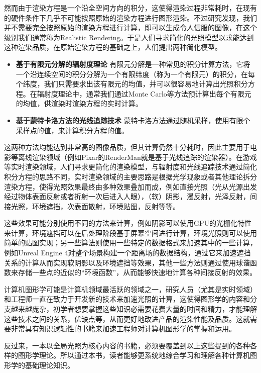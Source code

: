 然而由于渲染方程是一个沿全空间方向的积分，这使得渲染过程非常耗时，在现有的硬件条件下几乎不可能按照原始的渲染方程进行图形渲染。不过研究发现，我们并不需要完全按照原始的渲染方程进行计算，即可以生成令人信服的图像，在这个级别我们通常称为Realistic Rendering。于是人们寻求简化的光照模型以求能达到这种渲染品质，在原始渲染方程的基础之上，人们提出两种简化模型。

\begin{itemize}
	\item \textbf{基于有限元分解的辐射度理论 } 有限元分解是一种常见的积分计算方法，它将一个沿连续空间的积分分解为一个有限纬度（称为一个有限元）的积分，在每个纬度，我们只需要求出该有限元的均值，并可以很容易地计算出光照积分方程。在辐射度理论中，通常我们通过Monte Carlo等方法预计算出每个有限元的均值，供渲染时渲染方程的实时计算。
	\item \textbf{基于蒙特卡洛方法的光线追踪技术 } 蒙特卡洛方法通过随机采样，使用有限个采样点的值，来计算积分方程的值。
\end{itemize}

这两种方法均能达到非常高的图像品质，但其计算仍然十分耗时，因此主要用于电影等离线渲染领域（例如Pixar的RenderMan就是基于光线追踪的渲染器）。在游戏等实时渲染领域，人们寻求更简化的渲染模型，与辐射度和光线追踪技术通过简化积分方程的思路不同，实时渲染领域的主要思路是根据光学现象或者其他理论拆分渲染方程，使得光照效果最终由多种效果叠加而成，例如直接光照（光从光源出发经过物体表面反射或者折射一次后进入人眼），（软）阴影，漫反射，光泽反射，间接光照，环境遮挡，次表面散射，环境贴图，反射等等。

这些效果可能分别使用不同的方法来计算，例如阴影可以使用GPU的光栅化特性来计算，环境遮挡可以在后处理阶段基于屏幕空间进行计算，环境光照则可以使用简单的贴图实现；另一些算法则使用一些特定的数据格式来加速其中的一些计算，例如Unreal Engine 4对整个场景构建一个距离场的数据结构，通过它来加速遮挡关系的计算从而实现软阴影以及环境遮挡等效果，其他一些方法则通过使用球谐函数来存储一些点的近似的“环境函数”，从而能够快速地计算各种间接反射的效果。

计算机图形学可能是计算机领域最活跃的领域之一，研究人员（尤其是实时领域）和工程师一直在致力于开发新的技术来加速光照的计算，这使得图形学的内容和分支越来越庞杂，初学者想要掌握这些知识必需要花费大量的时间和精力，才能理解这些技术之间的关系，优缺点等，从而更好地改进产品的渲染性能及品质。这就需要非常具有知识逻辑性的书籍来加速工程师对计算机图形学的掌握和运用。

反过来，一本以全局光照为核心内容的书籍，必须要覆盖到以上这些提到的各种各样的图形学理论。所以通过本书，读者能够更系统地综合学习和理解各种计算机图形学的基础理论知识。



